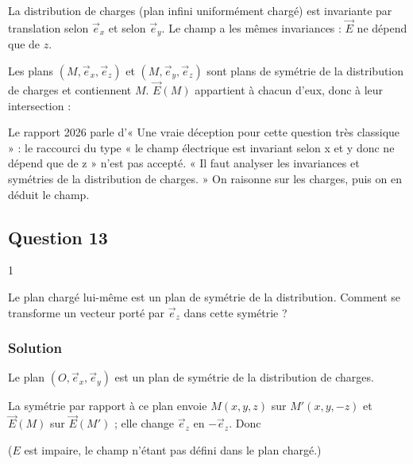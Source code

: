 \documentclass[11pt,a4paper]{article}
\newcommand{\equationajustee}[1]{%
  \sbox{\boiteequation}{$\displaystyle #1$}%
  \ifdim\wd\boiteequation>\linewidth
    \[\resizebox{\linewidth}{!}{\usebox{\boiteequation}}\]%
  \else
    \[#1\]%
  \fi}
\begin{document}
La distribution de charges (plan infini uniformément chargé) est invariante par translation selon \(\vec e_x\) et selon \(\vec e_y\). Le champ a les mêmes invariances : \(\vec E\) ne dépend que de \(z\).

Les plans \((M,\vec e_x,\vec e_z)\) et \((M,\vec e_y,\vec e_z)\) sont plans de symétrie de la distribution de charges et contiennent \(M\). \(\vec E(M)\) appartient à chacun d'eux, donc à leur intersection :

\equationajustee{\boxed{\vec E(M)=E(z)\,\vec e_z}}

\begin{jury}

Le rapport 2026 parle d'« Une vraie déception pour cette question très classique » : le raccourci du type « le champ électrique est invariant selon x et y donc ne dépend que de z » n'est pas accepté. « Il faut analyser les invariances et symétries de la distribution de charges. » On raisonne sur les charges, puis on en déduit le champ.

\end{jury}

\hypertarget{question-13}{%
\subsection{Question 13}\label{question-13}}

\begin{indication}{1}

Le plan chargé lui-même est un plan de symétrie de la distribution. Comment se transforme un vecteur porté par \(\vec e_z\) dans cette symétrie ?

\end{indication}

\hypertarget{solution-12}{%
\subsubsection{Solution}\label{solution-12}}

Le plan \((O,\vec e_x,\vec e_y)\) est un plan de symétrie de la distribution de charges.

La symétrie par rapport à ce plan envoie \(M(x,y,z)\) sur \(M'(x,y,-z)\) et \(\vec E(M)\) sur \(\vec E(M')\) ; elle change \(\vec e_z\) en \(-\vec e_z\). Donc

\equationajustee{\boxed{\vec E(-z)=-\vec E(z)}}

(\(E\) est impaire, le champ n'étant pas défini dans le plan chargé.)
\end{document}
